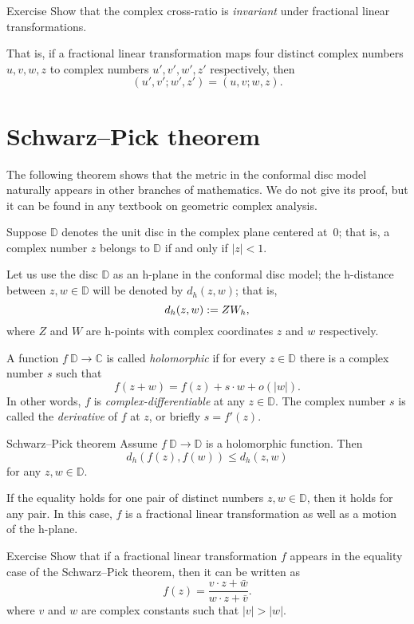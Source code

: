 \begin{thm}{Exercise}\label{ex:C-cross-ratio}
Show that the complex cross-ratio is {}\emph{invariant} under fractional linear transformations. 

That is, if a fractional linear transformation maps four distinct complex numbers $u, v, w, z$ to complex numbers $u', v', w', z'$ respectively, then
$$
(u',v';w',z')
=
(u,v;w,z).
$$

\end{thm}

\section{Schwarz--Pick theorem}

The following theorem shows 
that the metric in the conformal disc model naturally appears in other branches of mathematics.
We do not give its proof, but it can be found in any textbook on geometric complex analysis.

Suppose $\mathbb{D}$ denotes the unit disc in the complex plane centered at~$0$;
that is, a complex number $z$
belongs to $\mathbb{D}$ if and only if $|z|<1$.

Let us use the disc $\mathbb{D}$ as an h-plane in the conformal disc model;
the h-distance between $z, w\in\mathbb{D}$ will be denoted by $d_h(z,w)$;
that is,
\[d_h(z,w):= ZW_h,\]
where $Z$ and $W$ are h-points with complex coordinates $z$ and $w$ respectively.

A function $f\:\mathbb{D}\to \mathbb{C}$ is called \emph{holomorphic} if for every $z\in \mathbb{D}$
there is a complex number $s$ such that
\[f(z+w)=f(z)+s\cdot w+o(|w|).\]
In other words, $f$ is {}\emph{complex-differentiable}
at any $z\in\mathbb{D}$.
The complex number $s$ is called the {}\emph{derivative} of $f$ at $z$, or briefly $s=f'(z)$.

\begin{thm}{Schwarz--Pick theorem}
Assume $f\: \mathbb{D}\to \mathbb{D}$ is a holomorphic function.
Then 
\[d_h(f(z),f(w))\le d_h(z,w)\]
for any $z,w\in \mathbb{D}$.

If the equality holds for one pair of distinct numbers $z,w\in \mathbb{D}$, then it holds for any pair. 
In this case, $f$ is a fractional linear transformation as well as a motion of the h-plane.
\end{thm}

\begin{thm}{Exercise}\label{ex:schwarz-moebius}
Show that if a fractional linear transformation $f$ appears in the equality case of the Schwarz--Pick theorem, then it can be written as 
\[f(z)=\frac{v\cdot z+\bar w}{w\cdot z+\bar v}.\]
where $v$ and $w$ are complex constants such that $|v|>|w|$.
\end{thm}

